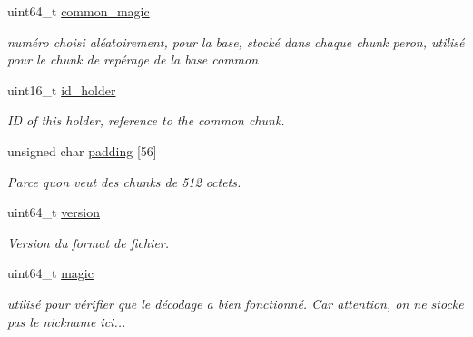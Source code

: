 \begin{DoxyCompactItemize}
\mbox{\label{structt__chunk__holder_aed75161f410191e3fe20ee75515f3dc5}} 
uint64\+\_\+t \hyperlink{structt__chunk__holder_aed75161f410191e3fe20ee75515f3dc5}{common\+\_\+magic}
\begin{DoxyCompactList}\small\item\em numéro choisi aléatoirement, pour la base, stocké dans chaque chunk peron, utilisé pour le chunk de repérage de la base common \end{DoxyCompactList}\item 
\mbox{\label{structt__chunk__holder_a25628b321342f8c061636ff5b72e96a9}} 
uint16\+\_\+t \hyperlink{structt__chunk__holder_a25628b321342f8c061636ff5b72e96a9}{id\+\_\+holder}
\begin{DoxyCompactList}\small\item\em ID of this holder, reference to the common chunk. \end{DoxyCompactList}\item 
\mbox{\label{structt__chunk__holder_a6b76101b323e5244262d5dd34e923b59}} 
unsigned char \hyperlink{structt__chunk__holder_a6b76101b323e5244262d5dd34e923b59}{padding} \mbox{[}56\mbox{]}
\begin{DoxyCompactList}\small\item\em Parce qu\textquotesingle{}on veut des chunks de 512 octets. \end{DoxyCompactList}\item 
\mbox{\label{structt__chunk__holder_ac1b22237159f2428bc02644b3ad9ac85}} 
uint64\+\_\+t \hyperlink{structt__chunk__holder_ac1b22237159f2428bc02644b3ad9ac85}{version}
\begin{DoxyCompactList}\small\item\em Version du format de fichier. \end{DoxyCompactList}\item 
\mbox{\label{structt__chunk__holder_aab086f744da859566586d32032ff2514}} 
uint64\+\_\+t \hyperlink{structt__chunk__holder_aab086f744da859566586d32032ff2514}{magic}
\begin{DoxyCompactList}\small\item\em utilisé pour vérifier que le décodage a bien fonctionné. Car attention, on ne stocke pas le nickname ici... \end{DoxyCompactList}\end{DoxyCompactItemize}


